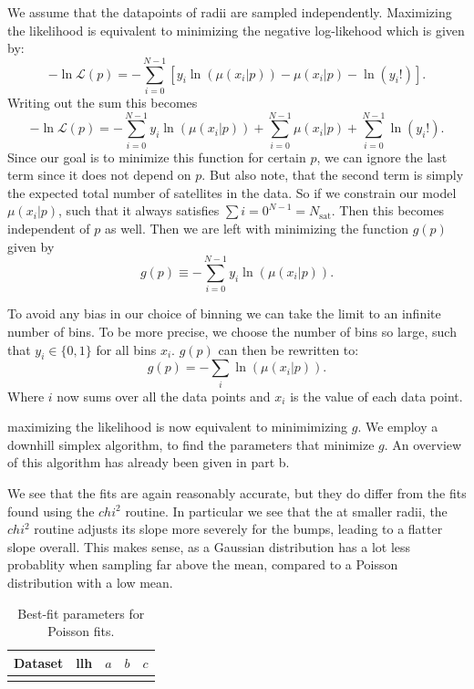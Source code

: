 \documentclass{article}
\begin{document}
We assume that the datapoints of radii are sampled independently. 
Maximizing the likelihood is equivalent to minimizing the negative log-likehood which is given by:
\begin{equation}
  -\ln \mathcal{L}(p)
  =
  -\sum_{i=0}^{N-1} 
  \left[
    y_i \ln (\mu(x_i|p)) 
    - \mu(x_i|p)
    - \ln(y_i!)
  \right].
\end{equation}
Writing out the sum this becomes
\begin{equation}
  -\ln \mathcal{L}(p)
  =
  -\sum_{i=0}^{N-1} 
    y_i \ln (\mu(x_i|p)) 
  +
  \sum_{i=0}^{N-1} 
   \mu(x_i|p)
  +
  \sum_{i=0}^{N-1} 
    \ln(y_i!).
\end{equation}
Since our goal is to minimize this function for certain $p$, we can ignore the
last term since it does not depend on $p$. But also note, that the second term 
is simply the expected total number of satellites in the data. So if we 
constrain our model $\mu(x_i|p)$, such that it always satisfies $\sum{i=0}^{N-1} = N_\mathrm{sat}$.
Then this becomes independent of $p$ as well.
Then we are left with minimizing the function $g(p)$ given by
\begin{equation}
  g(p) \equiv -\sum_{i=0}^{N-1} y_i \ln (\mu(x_i|p)).
\end{equation}

To avoid any bias in our choice of binning we can take the limit to an infinite number of bins.
To be more precise, we choose the number of bins so large, such that $y_i \in \{0, 1\}$
for all bins $x_i$.
$g(p)$ can then be rewritten to:
\begin{equation}
  g(p)
  =
  -\sum_{i} \ln (\mu(x_i|p)).
\end{equation}
Where $i$ now sums over all the data points and $x_i$ is the value of each data point.

maximizing the likelihood is now equivalent to minimimizing $g$. We employ a
downhill simplex algorithm, to find the parameters that minimize $g$. An overview of this 
algorithm has already been given in part b. 

We see that the fits are again reasonably accurate, but they do differ from the fits found using 
the $chi^2$ routine. In particular we see that the at smaller radii, the $chi^2$ routine adjusts its 
slope more severely for the bumps, leading to a flatter slope overall. This makes sense, 
as a Gaussian distribution has a lot less probablity when sampling far above the mean, compared 
to a Poisson distribution with a low mean.

\begin{table}[H]
\centering
\caption{Best-fit parameters for Poisson fits.}
\begin{tabular}{|c|c|c|c|c|}
\hline
Dataset  & llh & $a$ & $b$ & $c$ \\
\hline
 \\
\hline
\end{tabular}
\end{table}
\end{document}
